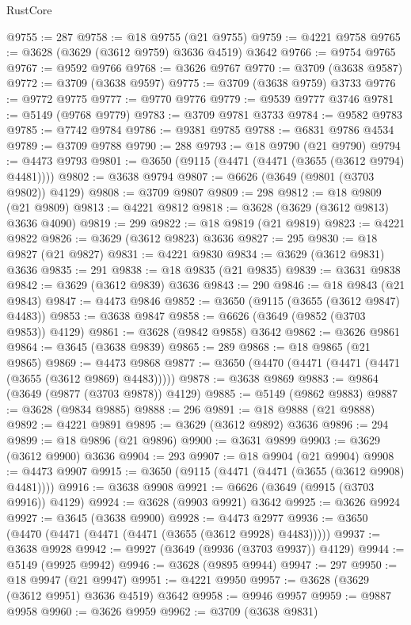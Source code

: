 \begin{lexlean}{RustCore}
\begin{coremodule}
@9755 := 287
@9758 := @18 @9755 (@21 @9755)
@9759 := @4221 @9758
@9765 := @3628 (@3629 (@3612 @9759) @3636 @4519) @3642
@9766 := @9754 @9765
@9767 := @9592 @9766
@9768 := @3626 @9767
@9770 := @3709 (@3638 @9587)
@9772 := @3709 (@3638 @9597)
@9775 := @3709 (@3638 @9759) @3733
@9776 := @9772 @9775
@9777 := @9770 @9776
@9779 := @9539 @9777 @3746
@9781 := @5149 (@9768 @9779)
@9783 := @3709 @9781 @3733
@9784 := @9582 @9783
@9785 := @7742 @9784
@9786 := @9381 @9785
@9788 := @6831 @9786 @4534
@9789 := @3709 @9788
@9790 := 288
@9793 := @18 @9790 (@21 @9790)
@9794 := @4473 @9793
@9801 := @3650 (@9115 (@4471 (@4471 (@3655 (@3612 @9794) @4481))))
@9802 := @3638 @9794
@9807 := @6626 (@3649 (@9801 (@3703 @9802)) @4129)
@9808 := @3709 @9807
@9809 := 298
@9812 := @18 @9809 (@21 @9809)
@9813 := @4221 @9812
@9818 := @3628 (@3629 (@3612 @9813) @3636 @4090)
@9819 := 299
@9822 := @18 @9819 (@21 @9819)
@9823 := @4221 @9822
@9826 := @3629 (@3612 @9823) @3636
@9827 := 295
@9830 := @18 @9827 (@21 @9827)
@9831 := @4221 @9830
@9834 := @3629 (@3612 @9831) @3636
@9835 := 291
@9838 := @18 @9835 (@21 @9835)
@9839 := @3631 @9838
@9842 := @3629 (@3612 @9839) @3636
@9843 := 290
@9846 := @18 @9843 (@21 @9843)
@9847 := @4473 @9846
@9852 := @3650 (@9115 (@3655 (@3612 @9847) @4483))
@9853 := @3638 @9847
@9858 := @6626 (@3649 (@9852 (@3703 @9853)) @4129)
@9861 := @3628 (@9842 @9858) @3642
@9862 := @3626 @9861
@9864 := @3645 (@3638 @9839)
@9865 := 289
@9868 := @18 @9865 (@21 @9865)
@9869 := @4473 @9868
@9877 := @3650 (@4470 (@4471 (@4471 (@4471 (@3655 (@3612 @9869) @4483)))))
@9878 := @3638 @9869
@9883 := @9864 (@3649 (@9877 (@3703 @9878)) @4129)
@9885 := @5149 (@9862 @9883)
@9887 := @3628 (@9834 @9885)
@9888 := 296
@9891 := @18 @9888 (@21 @9888)
@9892 := @4221 @9891
@9895 := @3629 (@3612 @9892) @3636
@9896 := 294
@9899 := @18 @9896 (@21 @9896)
@9900 := @3631 @9899
@9903 := @3629 (@3612 @9900) @3636
@9904 := 293
@9907 := @18 @9904 (@21 @9904)
@9908 := @4473 @9907
@9915 := @3650 (@9115 (@4471 (@4471 (@3655 (@3612 @9908) @4481))))
@9916 := @3638 @9908
@9921 := @6626 (@3649 (@9915 (@3703 @9916)) @4129)
@9924 := @3628 (@9903 @9921) @3642
@9925 := @3626 @9924
@9927 := @3645 (@3638 @9900)
@9928 := @4473 @2977
@9936 := @3650 (@4470 (@4471 (@4471 (@4471 (@3655 (@3612 @9928) @4483)))))
@9937 := @3638 @9928
@9942 := @9927 (@3649 (@9936 (@3703 @9937)) @4129)
@9944 := @5149 (@9925 @9942)
@9946 := @3628 (@9895 @9944)
@9947 := 297
@9950 := @18 @9947 (@21 @9947)
@9951 := @4221 @9950
@9957 := @3628 (@3629 (@3612 @9951) @3636 @4519) @3642
@9958 := @9946 @9957
@9959 := @9887 @9958
@9960 := @3626 @9959
@9962 := @3709 (@3638 @9831)

\end{coremodule}
\end{lexlean}
